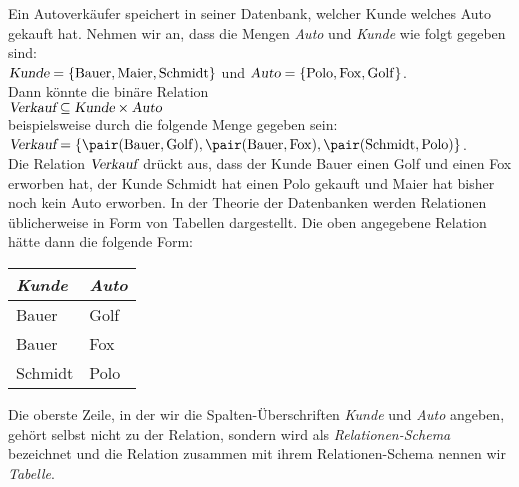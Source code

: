 \example
Ein Autoverkäufer speichert in seiner Datenbank, welcher Kunde welches Auto gekauft hat.
Nehmen wir an, dass die Mengen \textsl{Auto} und \textsl{Kunde} wie folgt gegeben sind:
\\[0.2cm]
\hspace*{1.3cm}
$\textsl{Kunde} = \{ \mathrm{Bauer}, \mathrm{Maier}, \mathrm{Schmidt} \}$
\quad und \quad
$\textsl{Auto} = \{ \mathrm{Polo}, \mathrm{Fox}, \mathrm{Golf} \}$.
\\[0.2cm]
Dann könnte die binäre Relation 
\\[0.2cm]
\hspace*{1.3cm}
$\textsl{Verkauf} \subseteq \textsl{Kunde} \times \textsl{Auto}$
\\[0.2cm]
beispielsweise durch die folgende Menge gegeben sein:
\\[0.2cm]
\hspace*{1.3cm}
$\textsl{Verkauf} = \{ \pair(\mathrm{Bauer}, \mathrm{Golf}), \pair(\mathrm{Bauer}, \mathrm{Fox}), \pair(\mathrm{Schmidt}, \mathrm{Polo})\}$.
\\[0.2cm]
Die Relation $\textsl{Verkauf}$ drückt aus, dass der Kunde Bauer einen Golf und einen Fox erworben
hat, der Kunde Schmidt hat einen Polo gekauft und Maier hat bisher noch kein Auto erworben.
In der Theorie der Datenbanken werden Relationen üblicherweise in Form von Tabellen
dargestellt. Die oben angegebene Relation hätte dann die folgende Form:
\begin{center}
  \begin{tabular}[c]{|l|l|}
\hline
\textsl{Kunde} & \textsl{Auto} \\
\hline
\hline
  Bauer   & Golf \\
\hline
  Bauer   & Fox  \\
\hline
  Schmidt & Polo \\
\hline
  \end{tabular}
\end{center}
Die oberste Zeile, in der wir die Spalten-Überschriften \textsl{Kunde} und \textsl{Auto}
angeben,  gehört selbst nicht zu der Relation, sondern wird als \emph{Relationen-Schema}
bezeichnet und die Relation zusammen mit ihrem Relationen-Schema nennen wir \emph{Tabelle}.  


